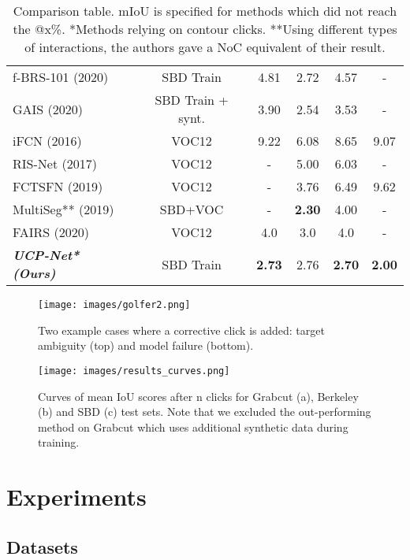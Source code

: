 \documentclass[letterpaper, 10 pt, conference]{ieeeconf}
\begin{document}
\begin{table*}
\begin{tabular*}{\textwidth}{l @{\extracolsep{\fill}} ccccc}
f-BRS-101 \cite{sofiiuk20} (2020) & SBD Train & 4.81 & 2.72 & 4.57 & - \\
GAIS \cite{forte20} (2020) & SBD Train + synt. & 3.90 & 2.54 & 3.53 & - \\ \hline
iFCN \cite{xu16} (2016) & VOC12 & 9.22 & 6.08 & 8.65 & 9.07 \\
RIS-Net \cite{liew17} (2017) & VOC12 & - & 5.00 & 6.03 & - \\
FCTSFN \cite{hu18} (2019) & VOC12 & - & 3.76 & 6.49 & 9.62 \\ \hline
MultiSeg** \cite{liew19} (2019) & SBD+VOC & - & \textbf{2.30} & 4.00 & - \\
FAIRS \cite{shahin20} (2020) & VOC12 & 4.0 & 3.0  & 4.0 & - \\ \hline \hline
\textit{\textbf{UCP-Net* (Ours)}} & SBD Train & \textbf{2.73} & 2.76 & \textbf{2.70} & \textbf{2.00} \\ \hline

\end{tabular*}
\caption{Comparison table. mIoU is specified for methods which did not reach the @x\%. *Methods relying on contour clicks. **Using different types of interactions, the authors gave a NoC equivalent of their result.} 
\label{tab:result_table}
\end{table*}

\begin{figure}
    \centering
    \texttt{[image: images/golfer2.png]}
    \caption{Two example cases where a corrective click is added: target ambiguity (top) and model failure (bottom).}
    \label{fig:corrective_click}
\end{figure}

\begin{figure*}
    \centering
    \texttt{[image: images/results\_curves.png]}
    \caption{Curves of mean IoU scores after n clicks for Grabcut \cite{rother04} (a), Berkeley \cite{martin01} (b) and SBD \cite{bharath11} (c) test sets. Note that we excluded the out-performing method \cite{forte20} on Grabcut which uses additional synthetic data during training. }
    \label{fig:curves}
\end{figure*}


\section{Experiments}

\subsection{Datasets}
\end{document}
